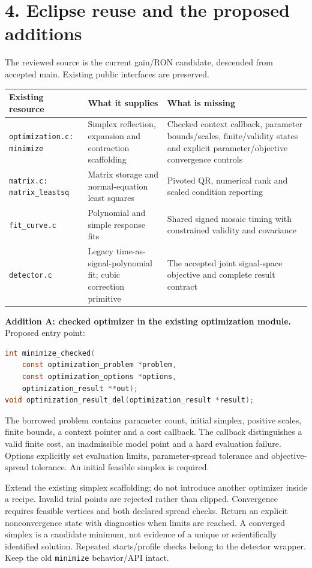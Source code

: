 \documentclass[11pt,a4paper]{article}
\begin{document}
\clearpage
\section*{4. Eclipse reuse and the proposed additions}
The reviewed source is the current gain/RON candidate, descended from accepted
main. Existing public interfaces are preserved.

\begin{tabularx}{\linewidth}{@{}p{36mm}XX@{}}\toprule
Existing resource&What it supplies&What is missing\\\midrule
\texttt{optimization.c: minimize}
&Simplex reflection, expansion and contraction scaffolding
&Checked context callback, parameter bounds/scales, finite/validity states and
explicit parameter/objective convergence controls\\
\texttt{matrix.c: matrix\_leastsq}
&Matrix storage and normal-equation least squares
&Pivoted QR, numerical rank and scaled condition reporting\\
\texttt{fit\_curve.c}
&Polynomial and simple response fits
&Shared signed mosaic timing with constrained validity and covariance\\
\texttt{detector.c}
&Legacy time-as-signal-polynomial fit; cubic correction primitive
&The accepted joint signal-space objective and complete result contract\\\bottomrule
\end{tabularx}

\textbf{Addition A: checked optimizer in the existing optimization module.}
Proposed entry point:
\begin{lstlisting}[language=C]
int minimize_checked(
    const optimization_problem *problem,
    const optimization_options *options,
    optimization_result **out);
void optimization_result_del(optimization_result *result);
\end{lstlisting}
The borrowed problem contains parameter count, initial simplex, positive scales,
finite bounds, a context pointer and a cost callback. The callback distinguishes
a valid finite cost, an inadmissible model point and a hard evaluation failure.
Options explicitly set evaluation limits, parameter-spread tolerance and
objective-spread tolerance. An initial feasible simplex is required.

Extend the existing simplex scaffolding; do not introduce another optimizer
inside a recipe. Invalid trial points are rejected rather than clipped.
Convergence requires feasible vertices and both declared spread checks.
Return an explicit nonconvergence state with diagnostics when limits are reached.
A converged simplex is a candidate minimum, not evidence of a unique or
scientifically identified solution. Repeated starts/profile checks belong to
the detector wrapper. Keep the old \texttt{minimize} behavior/API intact.
\end{document}
